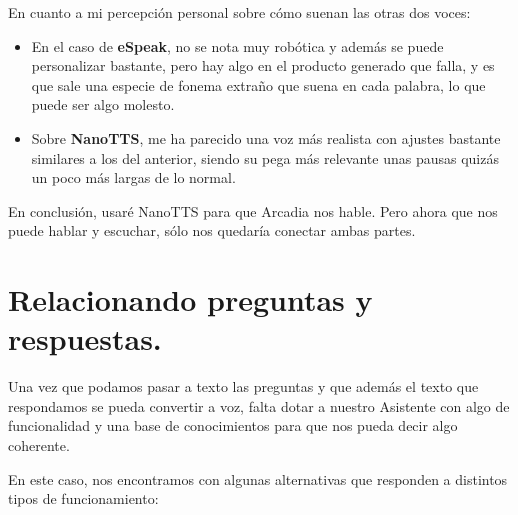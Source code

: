 En cuanto a mi percepción personal sobre cómo suenan las otras dos voces:
\begin{itemize}
	\item En el caso de \textbf{eSpeak}, no se nota muy robótica y además se puede personalizar bastante, pero hay algo en el producto generado que falla, y es que sale una especie de fonema extraño que suena en cada palabra, lo que puede ser algo molesto.
	\item Sobre \textbf{NanoTTS}, me ha parecido una voz más realista con ajustes bastante similares a los del anterior, siendo su pega más relevante unas pausas quizás un poco más largas de lo normal.
\end{itemize}

En conclusión, usaré NanoTTS para que Arcadia nos hable. Pero ahora que nos puede hablar y escuchar, sólo nos quedaría conectar ambas partes.

\section{Relacionando preguntas y respuestas.}
Una vez que podamos pasar a texto las preguntas y que además el texto que respondamos se pueda convertir a voz, falta dotar a nuestro Asistente con algo de funcionalidad y una base de conocimientos para que nos pueda decir algo coherente.

En este caso, nos encontramos con algunas alternativas que responden a distintos tipos de funcionamiento:

